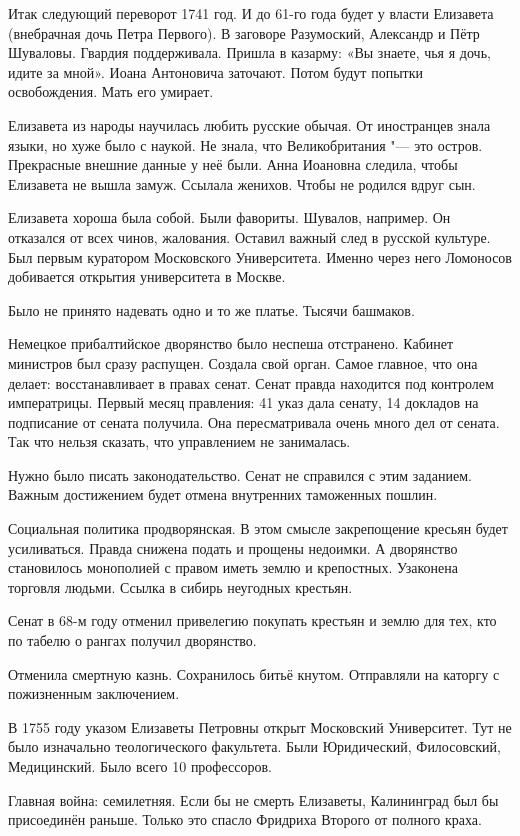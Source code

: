 Итак следующий переворот 1741 год. И до 61-го года будет у власти Елизавета (внебрачная дочь Петра Первого).
В заговоре Разумоский, Александр и Пётр Шуваловы. Гвардия поддерживала. Пришла в казарму: «Вы знаете, чья я дочь, идите за мной».
Иоана Антоновича заточают. Потом будут попытки освобождения. Мать его умирает.

Елизавета из народы научилась любить русские обычая. От иностранцев знала языки, но хуже было с наукой. Не знала, что Великобритания "--- это остров. Прекрасные внешние данные у неё были. 
Анна Иоановна следила, чтобы Елизавета не вышла замуж. Ссылала женихов. Чтобы не родился вдруг сын.

Елизавета хороша была собой. Были фавориты. Шувалов, например. Он отказался от всех чинов, жалования. Оставил важный след в русской культуре. Был первым куратором Московского Университета. Именно через него Ломоносов добивается открытия университета в Москве.

Было не принято надевать одно и то же платье. Тысячи башмаков.

Немецкое прибалтийское дворянство было неспеша отстранено. Кабинет министров был сразу распущен. Создала свой орган. Самое главное, что она делает: восстанавливает в правах сенат. Сенат правда находится под контролем императрицы. Первый месяц правления: 41 указ дала сенату, 14 докладов на подписание от сената получила. Она пересматривала очень много дел от сената. Так что нельзя сказать, что управлением не занималась.

Нужно было писать законодательство. Сенат не справился с этим заданием. Важным достижением будет отмена внутренних таможенных пошлин. 

Социальная политика продворянская. В этом смысле закрепощение кресьян будет усиливаться. Правда снижена подать и прощены недоимки. А дворянство становилось монополией с правом иметь землю и крепостных. Узаконена торговля людьми. Ссылка в сибирь неугодных крестьян.

Сенат в 68-м году отменил привелегию покупать крестьян и землю для тех, кто по табелю  о рангах получил дворянство.

Отменила смертную казнь. Сохранилось битьё кнутом. Отправляли на каторгу с пожизненным заключением.

В 1755 году указом Елизаветы Петровны открыт Московский Университет. Тут не было изначально теологического факультета. Были Юридический, Филосовский, Медицинский. Было всего 10 профессоров. 

Главная война: семилетняя. Если бы не смерть Елизаветы, Калининград был бы присоединён раньше. Только это спасло Фридриха Второго от полного краха.


